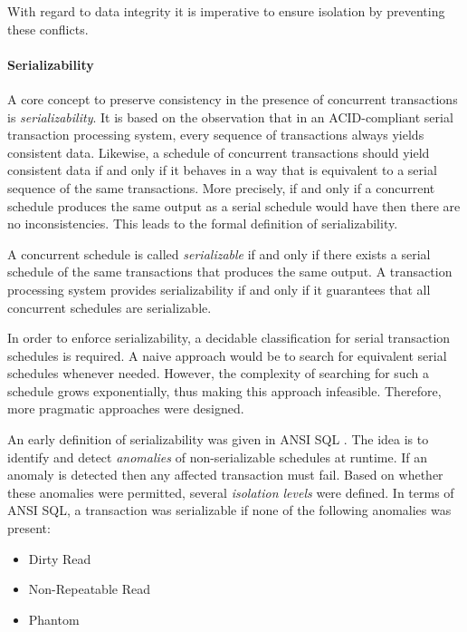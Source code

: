 
With regard to data integrity it is imperative to ensure isolation by preventing these conflicts.

\paragraph{Serializability}

A core concept to preserve consistency in the presence of concurrent
transactions is \emph{serializability}. It is based on the observation that in
an ACID-compliant serial transaction processing system, every sequence of
transactions always yields consistent data. Likewise, a schedule of concurrent
transactions should yield consistent data if and only if it behaves in a way
that is equivalent to a serial sequence of the same transactions. More
precisely, if and only if a concurrent schedule produces the same output as a
serial schedule would have then there are no inconsistencies. This leads to the
formal definition of serializability.

A concurrent schedule is called \emph{serializable} if and only if there exists
a serial schedule of the same transactions that produces the same output. A
transaction processing system provides serializability if and only if it
guarantees that all concurrent schedules are serializable.


In order to enforce serializability, a decidable classification for serial
transaction schedules is required. A naive approach would be to search for
equivalent serial schedules whenever needed. However, the complexity of
searching for such a schedule grows exponentially, thus making this approach
infeasible. Therefore, more pragmatic approaches were designed.

An early definition of serializability was given in ANSI SQL
\cite{berenson1995critique}. The idea is to identify and detect \emph{anomalies}
of non-serializable schedules at runtime. If an anomaly is detected then any
affected transaction must fail. Based on whether these anomalies were permitted,
several \emph{isolation levels} were defined. In terms of ANSI SQL, a
transaction was serializable if none of the following anomalies was present:

\begin{itemize}
    \item Dirty Read
    \item Non-Repeatable Read
    \item Phantom
\end{itemize}

